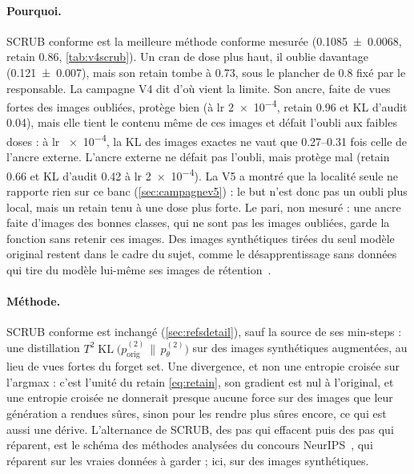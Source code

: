 \documentclass[11pt,a4paper]{article}
\newcommand{\KL}{\operatorname{KL}}
\newcommand{\orig}{\mathrm{orig}}
\begin{document}
\paragraph{Pourquoi.} SCRUB conforme est la meilleure méthode conforme mesurée
(\num{0.1085 +- 0.0068}, retain \num{0.86}, \cref{tab:v4scrub}). Un cran de dose plus haut, il oublie
davantage (\num{0.121 +- 0.007}), mais son retain tombe à \num{0.73}, sous le plancher de \num{0.8}
fixé par le responsable. La campagne V4 dit d'où vient la limite. Son ancre, faite de vues fortes des
images oubliées, protège bien (à lr \num{2e-4}, retain \num{0.96} et KL d'audit \num{0.04}), mais
elle tient le contenu même de ces images et défait l'oubli aux faibles doses : à lr \num{e-4}, la KL
des images exactes ne vaut que \numrange{0.27}{0.31} fois celle de l'ancre externe. L'ancre externe
ne défait pas l'oubli, mais protège mal (retain \num{0.66} et KL d'audit \num{0.42} à lr \num{2e-4}).
La V5 a montré que la localité seule ne rapporte rien sur ce banc (\cref{sec:campagnev5}) : le but
n'est donc pas un oubli plus local, mais un retain tenu à une dose plus forte. Le pari, non mesuré :
une ancre faite d'images des bonnes classes, qui ne sont pas les images oubliées, garde la fonction
sans retenir ces images. Des images synthétiques tirées du seul modèle original restent dans le cadre
du sujet, comme le désapprentissage sans données qui tire du modèle lui-même ses images de
rétention~\cite{chundawat2023}.

\paragraph{Méthode.} SCRUB conforme est inchangé (\cref{sec:refsdetail}), sauf la source de ses
min-steps : une distillation $T^2\KL\bigl(p^{(2)}_\orig\,\|\,p^{(2)}_\theta\bigr)$ sur des images
synthétiques augmentées, au lieu de vues fortes du forget set. Une divergence, et non une entropie
croisée sur l'argmax : c'est l'unité du retain \eqref{eq:retain}, son gradient est nul à l'original,
et une entropie croisée ne donnerait presque aucune force sur des images que leur génération a rendues
sûres, sinon pour les rendre plus sûres encore, ce qui est aussi une dérive. L'alternance de SCRUB,
des pas qui effacent puis des pas qui réparent, est le schéma des méthodes analysées du concours
NeurIPS~\cite{triantafillou2024}, qui réparent sur les vraies données à garder ; ici, sur des images
synthétiques.
\end{document}
